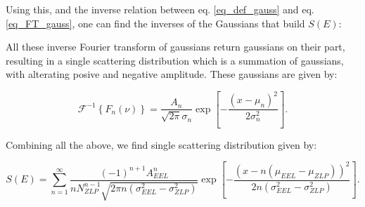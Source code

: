 
Using this, and the inverse relation between eq. \eqref{eq_def_gauss} and eq. \eqref{eq_FT_gauss}, one can find the inverses of the Gaussians that build $S(E)$:

All these inverse Fourier transform of gaussians return gaussians on their part, resulting in a single scattering distribution which is a summation of gaussians, with alterating posive and negative amplitude. These gaussians are given by:

\begin{equation}
\mathcal{F}^{-1}\left\{ F_n(\nu) \right\} = \frac{A_n}{\sqrt{2\pi}\sigma_n} \exp{\left[-\frac{(x-\mu_n)^2}{2\sigma_n^2}\right]}.
\end{equation}


Combining all the above, we find single scattering distribution given by:


\begin{equation}
S(E) = \sum_{n=1}^\infty \frac{(-1)^{n+1} A_{EEL}^n}{n N_{ZLP}^{n-1}\sqrt{2\pi n(\sigma_{EEL}^2 - \sigma_{ZLP}^2)}} \exp{\left[-\frac{(x-n(\mu_{EEL} - \mu_{ZLP}))^2}{2n(\sigma_{EEL}^2 - \sigma_{ZLP}^2)}\right]}.
\end{equation}



